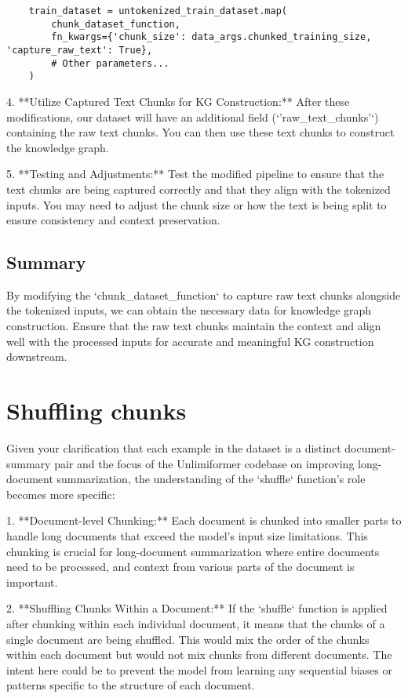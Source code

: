 \documentclass[12pt]{article}
\begin{document}
   \begin{lstlisting}
    train_dataset = untokenized_train_dataset.map(
        chunk_dataset_function,
        fn_kwargs={'chunk_size': data_args.chunked_training_size, 'capture_raw_text': True},
        # Other parameters...
    )
   \end{lstlisting}

4. **Utilize Captured Text Chunks for KG Construction:** After these
modifications, our dataset will have an additional field
(`'raw\_text\_chunks'`) containing the raw text chunks. You can then use
these text chunks to construct the knowledge graph.

5. **Testing and Adjustments:**
   Test the modified pipeline to ensure that the text chunks are being captured correctly and that they align with the tokenized inputs. You may need to adjust the chunk size or how the text is being split to ensure consistency and context preservation.

\subsection*{Summary}

By modifying the `chunk\_dataset\_function` to capture raw text chunks
alongside the tokenized inputs, we can obtain the necessary data for knowledge
graph construction. Ensure that the raw text chunks maintain the context and
align well with the processed inputs for accurate and meaningful KG
construction downstream.

\section*{Shuffling chunks}
Given your clarification that each example in the dataset is a distinct document-summary pair and the focus of the Unlimiformer codebase on improving long-document summarization, the understanding of the `shuffle` function's role becomes more specific:

1. **Document-level Chunking:**
   Each document is chunked into smaller parts to handle long documents that exceed the model's input size limitations. This chunking is crucial for long-document summarization where entire documents need to be processed, and context from various parts of the document is important.

2. **Shuffling Chunks Within a Document:**
   If the `shuffle` function is applied after chunking within each individual document, it means that the chunks of a single document are being shuffled. This would mix the order of the chunks within each document but would not mix chunks from different documents. The intent here could be to prevent the model from learning any sequential biases or patterns specific to the structure of each document.
\end{document}
